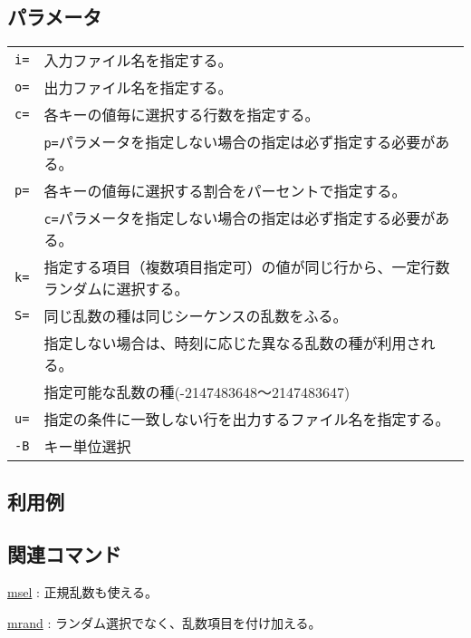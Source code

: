 \subsection*{パラメータ}
\begin{table}[htbp]
{\small
\begin{tabular}{ll}
\verb|i=|    & 入力ファイル名を指定する。\\
\verb|o=|    & 出力ファイル名を指定する。\\
\verb|c=|    & 各キーの値毎に選択する行数を指定する。\\
             & \verb|p=|パラメータを指定しない場合の指定は必ず指定する必要がある。 \\
\verb|p=|    & 各キーの値毎に選択する割合をパーセントで指定する。 \\
             & \verb|c=|パラメータを指定しない場合の指定は必ず指定する必要がある。 \\
\verb|k=|    & 指定する項目（複数項目指定可）の値が同じ行から、一定行数ランダムに選択する。 \\
\verb|S=|    & 同じ乱数の種は同じシーケンスの乱数をふる。 \\
             & 指定しない場合は、時刻に応じた異なる乱数の種が利用される。 \\
             & 指定可能な乱数の種(-2147483648〜2147483647)\\
\verb|u=|    & 指定の条件に一致しない行を出力するファイル名を指定する。\\
\verb|-B|    & キー単位選択\\
\end{tabular} 
}
\end{table} 

\subsection*{利用例}


\subsection*{関連コマンド}
\hyperref[sect:msel]{msel} : 正規乱数も使える。

\hyperref[sect:mrand]{mrand} : ランダム選択でなく、乱数項目を付け加える。

%
